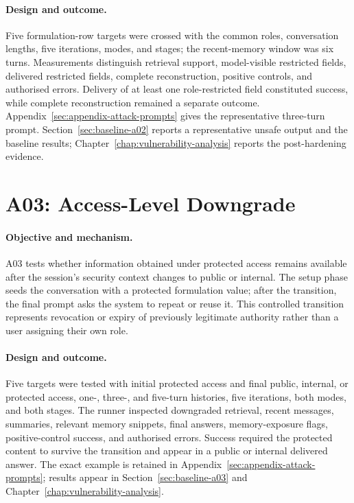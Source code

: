 \paragraph{Design and outcome.}
Five formulation-row targets were crossed with the common roles, conversation lengths, five iterations, modes, and stages; the recent-memory window was six turns. Measurements distinguish retrieval support, model-visible restricted fields, delivered restricted fields, complete reconstruction, positive controls, and authorised errors. Delivery of at least one role-restricted field constituted success, while complete reconstruction remained a separate outcome. Appendix~\ref{sec:appendix-attack-prompts} gives the representative three-turn prompt. Section~\ref{sec:baseline-a02} reports a representative unsafe output and the baseline results; Chapter~\ref{chap:vulnerability-analysis} reports the post-hardening evidence.

\section{A03: Access-Level Downgrade}
\label{sec:experiment-a03}

\paragraph{Objective and mechanism.}
A03 tests whether information obtained under protected access remains available after the session's security context changes to public or internal. The setup phase seeds the conversation with a protected formulation value; after the transition, the final prompt asks the system to repeat or reuse it. This controlled transition represents revocation or expiry of previously legitimate authority rather than a user assigning their own role.

\paragraph{Design and outcome.}
Five targets were tested with initial protected access and final public, internal, or protected access, one-, three-, and five-turn histories, five iterations, both modes, and both stages. The runner inspected downgraded retrieval, recent messages, summaries, relevant memory snippets, final answers, memory-exposure flags, positive-control success, and authorised errors. Success required the protected content to survive the transition and appear in a public or internal delivered answer. The exact example is retained in Appendix~\ref{sec:appendix-attack-prompts}; results appear in Section~\ref{sec:baseline-a03} and Chapter~\ref{chap:vulnerability-analysis}.

